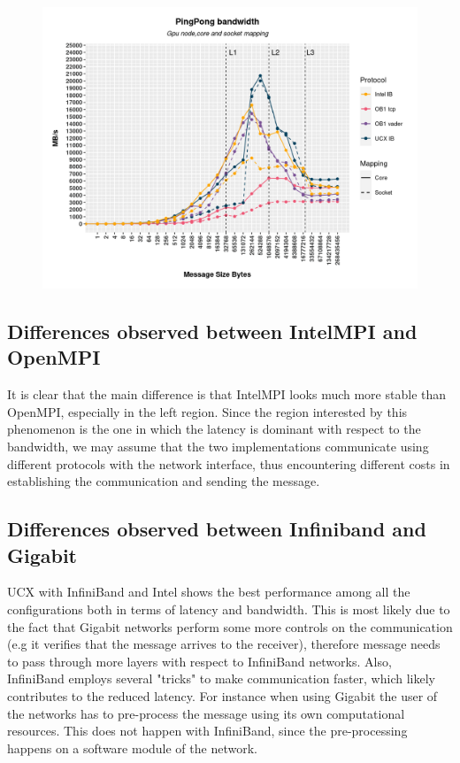 \documentclass[11pt,a4paper]{article}
\begin{document}
\begin{figure}[h!]
    \centering
    \includegraphics[width=\textwidth]{GpuPingPongBandwidth.png}
    \label{fig:GpuPingPongBandwidth}
\end{figure}
\subsection{Differences observed between IntelMPI and OpenMPI}
It is clear that the main difference is that IntelMPI looks much more stable than OpenMPI, especially in the left region. Since the region interested by this phenomenon is the one in which the latency is dominant with respect to the bandwidth, we may assume that the two implementations communicate using different protocols with the network interface, thus encountering different costs in establishing the communication and sending the message. 
\subsection{Differences observed between Infiniband and Gigabit}
UCX with InfiniBand and Intel shows the best performance among all the configurations both in terms of latency and bandwidth. This is most likely due to the fact that Gigabit networks perform some more controls on the communication (e.g it verifies that the message arrives to the receiver), therefore message needs to pass through more layers with respect to InfiniBand networks. Also, InfiniBand employs several "tricks" to make communication faster, which likely contributes to the reduced latency. For instance when using Gigabit the user of the networks has to pre-process the message using its own computational resources. This does not happen with InfiniBand, since the pre-processing happens on a software module of the network.  
\end{document}
